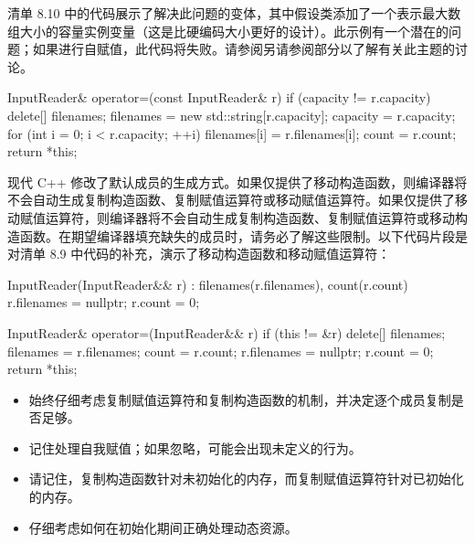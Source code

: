 清单 8.10 中的代码展示了解决此问题的变体，其中假设类添加了一个表示最大数组大小的容量实例变量（这是比硬编码大小更好的设计）。此示例有一个潜在的问题；如果进行自赋值，此代码将失败。请参阅另请参阅部分以了解有关此主题的讨论。


\begin{cpp}
InputReader& operator=(const InputReader& r) {
  if (capacity != r.capacity) {
    delete[] filenames;
    filenames = new std::string[r.capacity];
    capacity = r.capacity;
  }
  for (int i = 0; i < r.capacity; ++i)
    filenames[i] = r.filenames[i];
  count = r.count;
  return *this;
}
\end{cpp}

现代 C++ 修改了默认成员的生成方式。如果仅提供了移动构造函数，则编译器将不会自动生成复制构造函数、复制赋值运算符或移动赋值运算符。如果仅提供了移动赋值运算符，则编译器将不会自动生成复制构造函数、复制赋值运算符或移动构造函数。在期望编译器填充缺失的成员时，请务必了解这些限制。以下代码片段是对清单 8.9 中代码的补充，演示了移动构造函数和移动赋值运算符：

\begin{cpp}
InputReader(InputReader&& r) : filenames(r.filenames), count(r.count) {
  r.filenames = nullptr;
  r.count = 0;
}

InputReader& operator=(InputReader&& r) {
  if (this != &r) {
    delete[] filenames;
    filenames = r.filenames;
    count = r.count;
    r.filenames = nullptr;
    r.count = 0;
  }
  return *this;
}
\end{cpp}


\begin{itemize}
\item
始终仔细考虑复制赋值运算符和复制构造函数的机制，并决定逐个成员复制是否足够。

\item
记住处理自我赋值；如果忽略，可能会出现未定义的行为。

\item
请记住，复制构造函数针对未初始化的内存，而复制赋值运算符针对已初始化的内存。

\item
仔细考虑如何在初始化期间正确处理动态资源。
\end{itemize}










